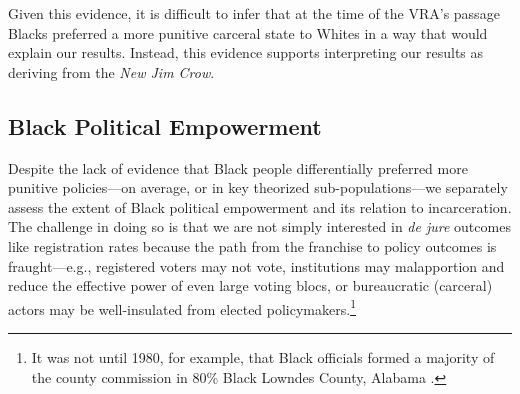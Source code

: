\documentclass[12pt]{article}
\begin{document}
Given this evidence, it is difficult to infer that at the time of the VRA's passage Blacks preferred a more punitive carceral state to Whites in a way that would explain our results. Instead, this evidence supports interpreting our results as deriving from the \emph{New Jim Crow}.


\subsection*{Black Political Empowerment}\label{section_blackpoliticalempowerment}

Despite the lack of evidence that Black people differentially preferred more punitive policies---on average, or in key theorized sub-populations---we separately assess the extent of Black political empowerment and its relation to incarceration. The challenge in doing so is that we are not simply interested in \emph{de jure} outcomes like registration rates because the path from the franchise to policy outcomes is fraught---e.g., registered voters may not vote, institutions may malapportion and reduce the effective power of even large voting blocs, or bureaucratic (carceral) actors may be well-insulated from elected policymakers.\footnote{It was not until 1980, for example, that Black officials formed a majority of the county commission in 80\% Black Lowndes County, Alabama \citep{Jeffries:2009wq}.}  %


\end{document}
